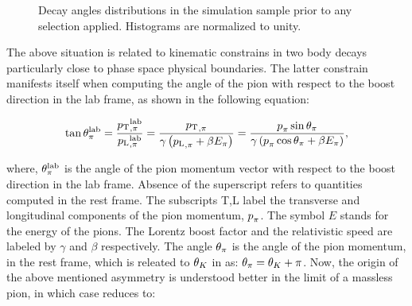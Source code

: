 \begin{figure}[t]
  \centering
  \begin{subfigure}{0.33\textwidth}
    \raggedright
    \scalebox{0.7}{}
    \caption{}
    \label{angDistr_ctk}
  \end{subfigure}%
  \hfill%
  \begin{subfigure}{0.33\textwidth}
    \raggedleft
    \scalebox{0.7}{}
    \caption{}
    \label{angDistr_ctl}
  \end{subfigure}%
  \hfill%
  \begin{subfigure}{0.33\textwidth}
    \raggedright
    \scalebox{0.7}{}
    \caption{}
    \label{angDistr_phi}
  \end{subfigure}
  \caption{Decay angles distributions in the simulation sample prior to any selection applied. Histograms are normalized to unity.}
  \label{angDistr_all}
\end{figure}

The above situation is related to kinematic constrains in two body decays particularly close to phase
space physical boundaries. The latter constrain manifests itself when computing the angle of the pion
with respect to the boost direction in the lab frame, as shown in the following equation:

\begin{equation}
  \centering
  \tan\thetapi^\lab = \frac{\ptrans{\pi}^\lab}{\plongd{\pi}^\lab}
               = \frac{\ptrans{\pi}}{\gamma\parenthesis{\plongd{\pi} + \beta E_\pi} }
               = \frac{\ptot_{\pi} \sin\thetapi}{\gamma\parenthesis{\ptot_{\pi} \cos\thetapi + \beta E_\pi} },
  \label{pi_angle}
\end{equation}

\noindent where, $\theta_{\pi}^{\rm lab}$ is the angle of the pion momentum vector with respect to the boost direction
in the lab frame. Absence of the \lab superscript refers to quantities computed in the \Kstarz rest frame.
The subscripts T,L label the transverse and longitudinal components of the pion momentum, $\mbox{$p$}_{\pi}$.
The symbol $E$ stands for the energy of the pions. The Lorentz boost factor and the relativistic speed
are labeled by $\gamma$ and $\beta$ respectively. The angle $\theta_{\pi}$ is the angle of the pion momentum,
in the \Kstarz rest frame, which is releated to $\theta_{K}$ in  as: $\theta_{\pi} = \theta_{K} + \pi$.
Now, the origin of the above mentioned asymmetry is understood better in the limit of a massless pion,
in which case  reduces to:

